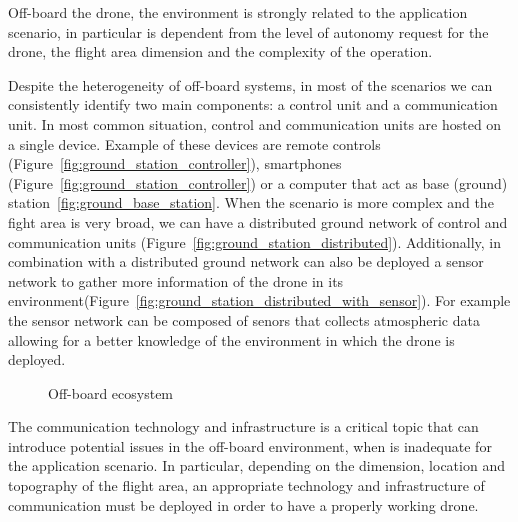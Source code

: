 Off-board the drone, the environment is strongly related to the application scenario, in particular is dependent from the level
of autonomy request for the drone, the flight area dimension and the complexity of the operation.

Despite the heterogeneity of off-board systems, in most of the scenarios we can consistently identify two main components: 
a control unit and a communication unit. In most common situation, control and communication units are hosted on a single device.
Example of these devices are remote controls (Figure~\ref{fig:ground_station_controller}), smartphones (Figure~\ref{fig:ground_station_controller})
or a computer that act as base (ground) station~\ref{fig:ground_base_station}.
When the scenario is more complex and the fight area is very broad, 
we can have a distributed ground network of control and communication units (Figure~\ref{fig:ground_station_distributed}).
Additionally, in combination with a distributed ground network can also be deployed a sensor network to gather more
information of the drone in its environment(Figure~\ref{fig:ground_station_distributed_with_sensor}). 
For example the sensor network can be composed of senors that collects atmospheric data allowing for a better knowledge of the environment
in which the drone is deployed. 

\begin{figure}[h]
    \centering
    \quad
    \quad
    \quad
    \quad
    \caption[Off-board ecosystem]{Off-board ecosystem}\label{fig:off_board_ecosystem}
\end{figure}

The communication technology and infrastructure is a critical topic that can introduce potential issues 
in the off-board environment, when is inadequate for the application scenario.
In particular, depending on the dimension, location and topography of the flight area, an appropriate technology and 
infrastructure of communication must be deployed in order to have a properly working drone.

